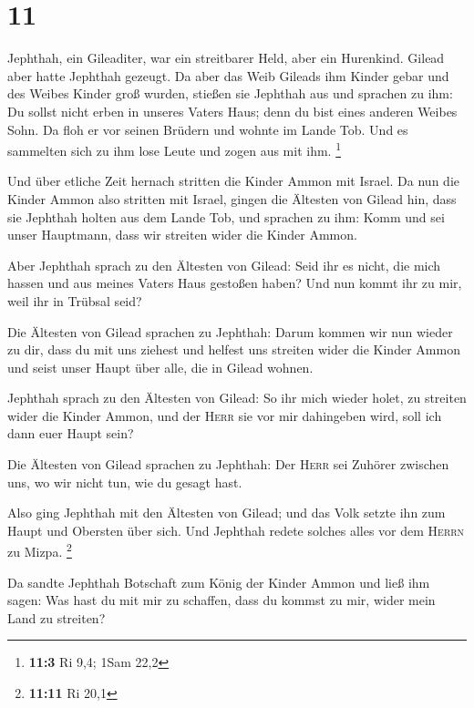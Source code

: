 \hypertarget{section-4}{%
\section{11}\label{section-4}}

 Jephthah, ein Gileaditer, war ein streitbarer Held, aber
ein Hurenkind. Gilead aber hatte Jephthah gezeugt.  Da
aber das Weib Gileads ihm Kinder gebar und des Weibes Kinder groß
wurden, stießen sie Jephthah aus und sprachen zu ihm: Du sollst nicht
erben in unseres Vaters Haus; denn du bist eines anderen Weibes Sohn.
 Da floh er vor seinen Brüdern und wohnte im Lande Tob.
Und es sammelten sich zu ihm lose Leute und zogen aus mit ihm.
\footnote{\textbf{11:3} Ri 9,4; 1Sam 22,2}

 Und über etliche Zeit hernach stritten die Kinder Ammon
mit Israel.  Da nun die Kinder Ammon also stritten mit
Israel, gingen die Ältesten von Gilead hin, dass sie Jephthah holten aus
dem Lande Tob,  und sprachen zu ihm: Komm und sei unser
Hauptmann, dass wir streiten wider die Kinder Ammon.

 Aber Jephthah sprach zu den Ältesten von Gilead: Seid ihr
es nicht, die mich hassen und aus meines Vaters Haus gestoßen haben? Und
nun kommt ihr zu mir, weil ihr in Trübsal seid?

 Die Ältesten von Gilead sprachen zu Jephthah: Darum
kommen wir nun wieder zu dir, dass du mit uns ziehest und helfest uns
streiten wider die Kinder Ammon und seist unser Haupt über alle, die in
Gilead wohnen.

 Jephthah sprach zu den Ältesten von Gilead: So ihr mich
wieder holet, zu streiten wider die Kinder Ammon, und der \textsc{Herr}
sie vor mir dahingeben wird, soll ich dann euer Haupt sein?

 Die Ältesten von Gilead sprachen zu Jephthah: Der
\textsc{Herr} sei Zuhörer zwischen uns, wo wir nicht tun, wie du gesagt
hast.

 Also ging Jephthah mit den Ältesten von Gilead; und das
Volk setzte ihn zum Haupt und Obersten über sich. Und Jephthah redete
solches alles vor dem \textsc{Herrn} zu Mizpa. \footnote{\textbf{11:11}
  Ri 20,1}

 Da sandte Jephthah Botschaft zum König der Kinder Ammon
und ließ ihm sagen: Was hast du mit mir zu schaffen, dass du kommst zu
mir, wider mein Land zu streiten?

